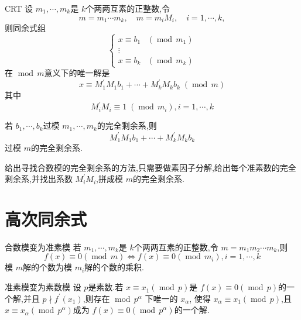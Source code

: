 \documentclass[lang=cn,12pt,color=green,fontset=none]{elegantbook}
\begin{document}
\begin{theorem}{CRT}
    设 \(   m_1,\cdots,m_k   \)是 \(  k  \)个两两互素的正整数,令 \[
    m=  m_1\cdots m_{k},\quad m= m_{i}M_{i},\quad i=  1,\cdots,k ,
    \]则同余式组 \[
    \begin{cases} x \equiv b_1&\left( \operatorname{mod}\,m_1 \right)\\ 
     \vdots\\ 
      x \equiv b_{k}&\left( \operatorname{mod}\,m_{k}  \right) \end{cases} 
    \]  在 \(  \operatorname{mod}\,m  \)意义下的唯一解是 \[
    x \equiv M_1^{\prime} M_1b_1+ \cdots + M^{\prime} _{k}M_{k}b_{k}\;\left( \operatorname{mod}\,m \right) 
    \] 其中 \[
    M_{i}^{\prime} M_{i}\equiv 1 \;\left( \operatorname{mod}\, m_{i} \right),i=  1,\cdots,k  
    \]
\end{theorem}

\begin{theorem}
    若 \(   b_1,\cdots,b_k   \)过模 \(   m_1,\cdots,m_k   \)的完全剩余系,则 \[
    M_{1}^{\prime} M_1b_1+ \cdots + M_{k}^{\prime} M_{k}b_{k}
    \]  过模 \(  m  \)的完全剩余系. 
\end{theorem}
\begin{remark}
    给出寻找合数模的完全剩余系的方法,只需要做素因子分解,给出每个准素数的完全剩余系,并找出系数 \(  M_{i}^{\prime} M_{i}  \),拼成模 \(  m  \)的完全剩余系.  
\end{remark}

\section{高次同余式}

\begin{theorem}{合数模变为准素模}
    若 \(   m_1,\cdots,m_k   \)是 \(  k  \)个两两互素的正整数,令 \(  m = m_1m_2\cdots m_{k}  \),则 \[
    f\left( x \right)\equiv 0\left( \operatorname{mod}\,m \right)\iff  f\left( x \right)\equiv 0\left( \operatorname{mod}\,m_{i} \right), i=  1,\cdots,k     
    \]  模 \(  m  \)解的个数为模 \(  m_{i}  \)解的个数的乘积.   
\end{theorem}

\begin{theorem}{准素模变为素数模}
    设 \(  p  \)是素数.若 \(  x \equiv x_1\left( \operatorname{mod}\,p \right)   \)是 \(  f\left( x \right)\equiv 0\left( \operatorname{mod}\,p \right)    \)的一个解,并且 \(  p \nmid f^{\prime} \left( x_1 \right)   \),则存在 \(  \operatorname{mod}\, p^{ \alpha }  \) 下唯一的 \(  x_{\alpha }  \),
    使得 \(  x_{\alpha }\equiv x_1\left( \operatorname{mod}\,p \right)   \),且 \(  x\equiv x_{\alpha }  \left( \operatorname{mod}\,p^{\alpha } \right) \)成为 \(  f\left( x \right)\equiv 0\left( \operatorname{mod}\,p^{\alpha } \right)    \)的一个解.   
\end{theorem}
\end{document}
